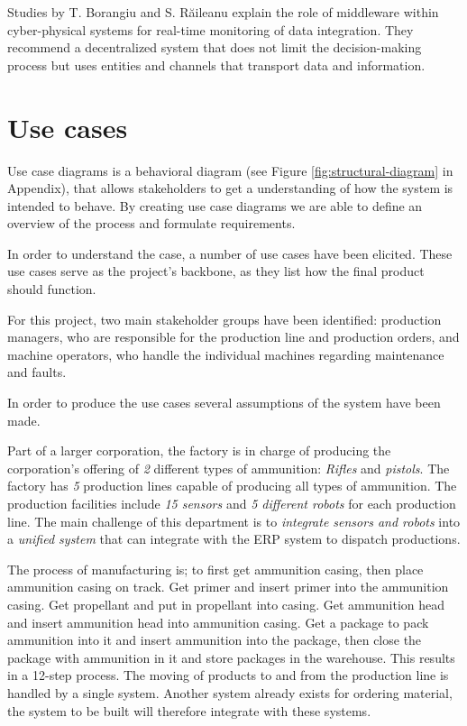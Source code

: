 Studies by T. Borangiu and S. Răileanu \cite{Borangiu2020} explain the role of middleware within cyber-physical systems for real-time monitoring of data integration. They recommend a decentralized system that does not limit the decision-making process but uses entities and channels that transport data and information.

\section{Use cases}
\label{sec:use-case}


Use case diagrams is a behavioral diagram (see Figure \ref{fig:structural-diagram} in Appendix), that allows stakeholders to get a understanding of how the system is intended to behave. By creating use case diagrams we are able to define an overview of the process and formulate requirements. 

In order to understand the case, a number of use cases have been elicited. These use cases serve as the project's backbone, as they list how the final product should function.

For this project, two main stakeholder groups have been identified: production managers, who are responsible for the production line and production orders, and machine operators, who handle the individual machines regarding maintenance and faults.


In order to produce the use cases several assumptions of the system have been made.

Part of a larger corporation, the factory is in charge of producing the corporation's offering of \textit{2} different types of ammunition: \textit{Rifles} and \textit{pistols}. 
The factory has \textit{5} production lines capable of producing all types of ammunition.
The production facilities include \textit{15 sensors} and \textit{5 different robots} for each production line.
The main challenge of this department is to \textit{integrate sensors and robots} into a \textit{unified system} that can integrate with the ERP system to dispatch productions.

The process of manufacturing is; to first get ammunition casing, then place ammunition casing on track. Get primer
and insert primer into the ammunition casing. Get propellant and put in propellant into casing. Get ammunition head and insert ammunition head into ammunition casing. Get a package to pack ammunition into it and insert ammunition into the package, then close the package with ammunition in it and store packages in the warehouse. This results in a 12-step process.
The moving of products to and from the production line is handled by a single system. Another system already exists for ordering material, the system to be built will therefore integrate with these systems.

